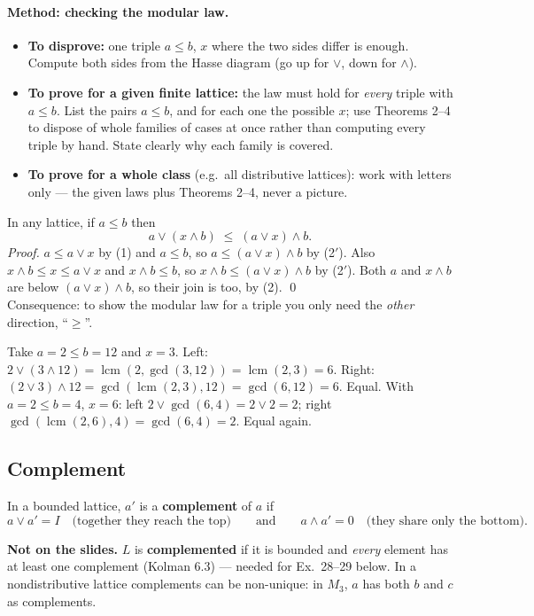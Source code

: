 \documentclass{fkt-notes}
\DeclareMathOperator{\lcm}{lcm}
\newcommand{\notslides}[1]{\par\noindent\textbf{Not on the slides.} #1\par}
\theoremstyle{definition}
\begin{document}
\paragraph{Method: checking the modular law.}
%
\begin{itemize}[nosep]
  \item \textbf{To disprove:} one triple $a\le b$, $x$ where the two sides
        differ is enough. Compute both sides from the Hasse diagram (go up
        for $\vee$, down for $\wedge$).
  \item \textbf{To prove for a given finite lattice:} the law must hold
        for \emph{every} triple with $a\le b$. List the pairs $a\le b$,
        and for each one the possible $x$; use Theorems 2--4 to dispose
        of whole families of cases at once rather than computing every
        triple by hand. State clearly why each family is covered.
  \item \textbf{To prove for a whole class} (e.g.\ all distributive
        lattices): work with letters only --- the given laws plus
        Theorems 2--4, never a picture.
\end{itemize}

\begin{rulebox}[title={Useful inequality (proved here, so it can be cited by this proof)}]
  In any lattice, if $a\le b$ then
  \[
    a\vee(x\wedge b)\;\le\;(a\vee x)\wedge b .
  \]
  \emph{Proof.} $a\le a\vee x$ by (1) and $a\le b$, so $a\le(a\vee x)\wedge b$
  by (2$'$). Also $x\wedge b\le x\le a\vee x$ and $x\wedge b\le b$, so
  $x\wedge b\le(a\vee x)\wedge b$ by (2$'$). Both $a$ and $x\wedge b$ are
  below $(a\vee x)\wedge b$, so their join is too, by (2). \qed\\
  Consequence: to show the modular law for a triple you only need the
  \emph{other} direction, ``$\ge$''.
\end{rulebox}

\begin{example}
  Take $a=2\le b=12$ and $x=3$. Left: $2\vee(3\wedge12)=\lcm(2,\gcd(3,12))
    =\lcm(2,3)=6$. Right: $(2\vee3)\wedge12=\gcd(\lcm(2,3),12)=\gcd(6,12)=6$.
  Equal. With $a=2\le b=4$, $x=6$: left $2\vee\gcd(6,4)=2\vee2=2$; right
  $\gcd(\lcm(2,6),4)=\gcd(6,4)=2$. Equal again.
\end{example}

\subsection{Complement}
%
In a bounded lattice, $a'$ is a
\textbf{complement} of $a$ if
\[
  a\vee a'=I\quad\text{(together they reach the top)}\qquad\text{and}\qquad
  a\wedge a'=0\quad\text{(they share only the bottom)}.
\]
\notslides{$L$ is \textbf{complemented} if it is bounded and
  \emph{every} element has at least one complement (Kolman 6.3) ---
  needed for Ex.~28--29 below. In a nondistributive lattice complements
  can be non-unique: in $M_3$, $a$ has both $b$ and $c$ as complements.}
\end{document}
